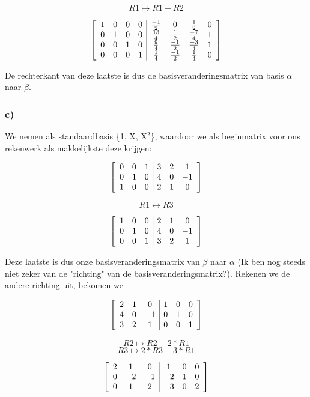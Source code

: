 \documentclass[lineaire_algebra_oplossingen.tex]{subfiles}
\begin{document}
\[R1 \mapsto R1 - R2 \]

\[
\left[
\begin{array}{ c c c c | c c c c }
1 & 0 & 0 & 0 & \frac{-1}{2} & 0 & \frac{1}{2} & 0\\
0 & 1 & 0 & 0 & \frac{13}{4} & \frac{1}{2} & \frac{-7}{4} & 1\\
0 & 0 & 1 & 0 & \frac{9}{4} & \frac{-1}{2} & \frac{-3}{4} & 1\\
0 & 0 & 0 & 1 & \frac{1}{4} & \frac{-1}{2} & \frac{1}{4} & 0
\end{array}
\right]
\]

De rechterkant van deze laatste is dus de basisveranderingsmatrix van basis $\alpha$ naar $\beta$.

\subsubsection*{c)}
We nemen als standaardbasis \{1, X, X$^2$\}, waardoor we als beginmatrix voor ons rekenwerk als makkelijkste deze krijgen:

\[
\left[
\begin{array}{ c c c | c c c }
0 & 0 & 1 & 3 & 2 & 1\\
0 & 1 & 0 & 4 & 0 & -1\\
1 & 0 & 0 & 2 & 1 & 0
\end{array}
\right]
\]

\[R1 \leftrightarrow R3 \]

\[
\left[
\begin{array}{ c c c | c c c }
1 & 0 & 0 & 2 & 1 & 0\\
0 & 1 & 0 & 4 & 0 & -1\\
0 & 0 & 1 & 3 & 2 & 1
\end{array}
\right]
\]

Deze laatste is dus onze basisveranderingsmatrix van $\beta$ naar $\alpha$ (Ik ben nog steeds niet zeker van de "richting" van de basisveranderingsmatrix?). Rekenen we de andere richting uit, bekomen we

\[
\left[
\begin{array}{ c c c | c c c }
2 & 1 & 0 & 1 & 0 & 0\\
4 & 0 & -1 & 0 & 1 & 0\\
3 & 2 & 1 & 0 & 0 & 1
\end{array}
\right]
\]

\[R2 \mapsto R2 - 2*R1 \]
\[R3 \mapsto 2*R3 - 3*R1 \]

\[
\left[
\begin{array}{ c c c | c c c }
2 & 1 & 0 & 1 & 0 & 0\\
0 & -2 & -1 & -2 & 1 & 0\\
0 & 1 & 2 & -3 & 0 & 2
\end{array}
\right]
\]
\end{document}

